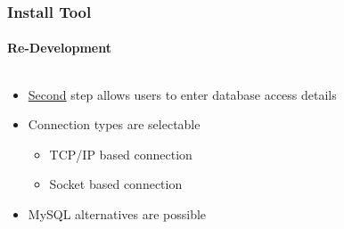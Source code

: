 
\begin{frame}[fragile]
	\frametitle{Install Tool}
	\framesubtitle{Re-Development}

	\begin{columns}[T]

		\begin{column}{.5\textwidth}
			\begin{itemize}
				\item \underline{Second} step allows users to enter database access details
				\item Connection types are selectable
					\begin{itemize}
						\item TCP/IP based connection
						\item Socket based connection
					\end{itemize}
				\item MySQL alternatives are possible
			\end{itemize}
		\end{column}

		\begin{column}{.5\textwidth}
		\end{column}

	\end{columns}

\end{frame}


